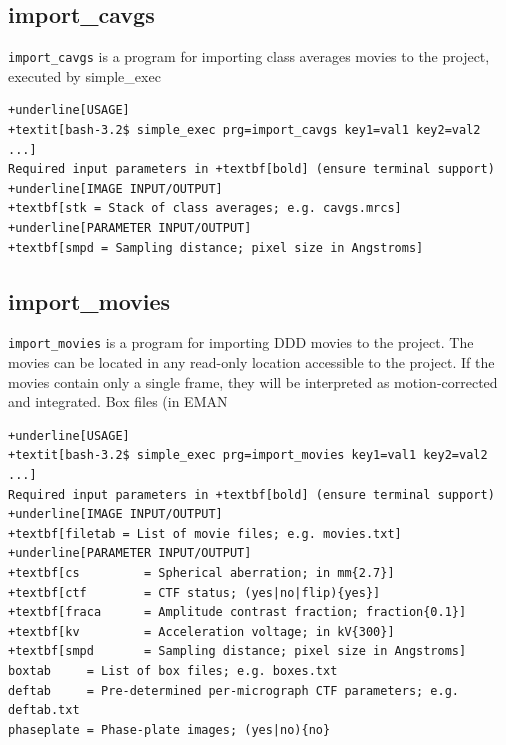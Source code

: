 \documentclass[a4paper,11pt]{article}
\newcommand{\prgname}[1]{\textcolor{NavyBlue}{\texttt{#1}}}
\begin{document}
\subsection{import\_cavgs}
\label{import_cavgs}
\prgname{import\_cavgs} is a program for importing class averages movies to the project, executed by simple\_exec
\begin{Verbatim}[commandchars=+\[\],fontsize=\small,breaklines=true]
+underline[USAGE]
+textit[bash-3.2$ simple_exec prg=import_cavgs key1=val1 key2=val2 ...]
Required input parameters in +textbf[bold] (ensure terminal support)
+underline[IMAGE INPUT/OUTPUT]
+textbf[stk = Stack of class averages; e.g. cavgs.mrcs]
+underline[PARAMETER INPUT/OUTPUT]
+textbf[smpd = Sampling distance; pixel size in Angstroms]
\end{Verbatim}

\subsection{import\_movies}
\label{import_movies}
\prgname{import\_movies} is a program for importing DDD movies to the project. The movies can be located in any read-only location accessible to the project. If the movies contain only a single frame, they will be interpreted as motion-corrected and integrated. Box files (in EMAN
\begin{Verbatim}[commandchars=+\[\],fontsize=\small,breaklines=true]
+underline[USAGE]
+textit[bash-3.2$ simple_exec prg=import_movies key1=val1 key2=val2 ...]
Required input parameters in +textbf[bold] (ensure terminal support)
+underline[IMAGE INPUT/OUTPUT]
+textbf[filetab = List of movie files; e.g. movies.txt]
+underline[PARAMETER INPUT/OUTPUT]
+textbf[cs         = Spherical aberration; in mm{2.7}]
+textbf[ctf        = CTF status; (yes|no|flip){yes}]
+textbf[fraca      = Amplitude contrast fraction; fraction{0.1}]
+textbf[kv         = Acceleration voltage; in kV{300}]
+textbf[smpd       = Sampling distance; pixel size in Angstroms]
boxtab     = List of box files; e.g. boxes.txt
deftab     = Pre-determined per-micrograph CTF parameters; e.g. deftab.txt
phaseplate = Phase-plate images; (yes|no){no}
\end{Verbatim}
\end{document}
